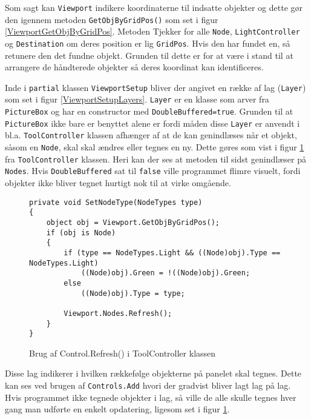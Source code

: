 Som sagt kan \texttt{Viewport} indikere koordinaterne til indsatte objekter og dette gør den igennem metoden \texttt{GetObjByGridPos()} som set i figur \ref{ViewportGetObjByGridPos}. Metoden Tjekker for alle \texttt{Node}, \texttt{LightController} og \texttt{Destination} om deres position er lig \texttt{GridPos}. Hvis den har fundet en, så retunere den det fundne objekt. Grunden til dette er for at være i stand til at arrangere de håndterede objekter så deres koordinat kan identificeres.

\vspace{5mm}

Inde i \texttt{partial} klassen \texttt{ViewportSetup} bliver der angivet en række af lag (\texttt{Layer}) som set i figur \ref{ViewportSetupLayers}. \texttt{Layer} er en klasse som arver fra \texttt{PictureBox} og har en constructor med \texttt{DoubleBuffered=true}. Grunden til at \texttt{PictureBox} ikke bare er benyttet alene er fordi måden disse \texttt{Layer} er anvendt i bl.a. \texttt{ToolController} klassen afhænger af at de kan genindlæses når et objekt, såsom en \texttt{Node}, skal skal ændres eller tegnes en ny. Dette gøres som vist i figur \ref{ToolControllerSetNodeType} fra \texttt{ToolController} klassen. Heri kan der ses at metoden til sidst genindlæser på \texttt{Nodes}. Hvis \texttt{DoubleBuffered} sat til \texttt{false} ville programmet flimre visuelt, fordi objekter ikke bliver tegnet hurtigt nok til at virke omgående.

\begin{figure}[H]
\begin{lstlisting}
private void SetNodeType(NodeTypes type)
{
    object obj = Viewport.GetObjByGridPos();
    if (obj is Node)
    {
        if (type == NodeTypes.Light && ((Node)obj).Type == NodeTypes.Light)
            ((Node)obj).Green = !((Node)obj).Green;
        else
            ((Node)obj).Type = type;

        Viewport.Nodes.Refresh();
    }
}
\end{lstlisting}
\caption{Brug af Control.Refresh() i ToolController klassen}
\label{ToolControllerSetNodeType}
\end{figure}

Disse lag indikerer i hvilken rækkefølge objekterne på panelet skal tegnes. Dette kan ses ved brugen af \texttt{Controls.Add} hvori der gradvist bliver lagt lag på lag. Hvis programmet ikke tegnede objekter i lag, så ville de alle skulle tegnes hver gang man udførte en enkelt opdatering, ligesom set i figur \ref{ToolControllerSetNodeType}.

